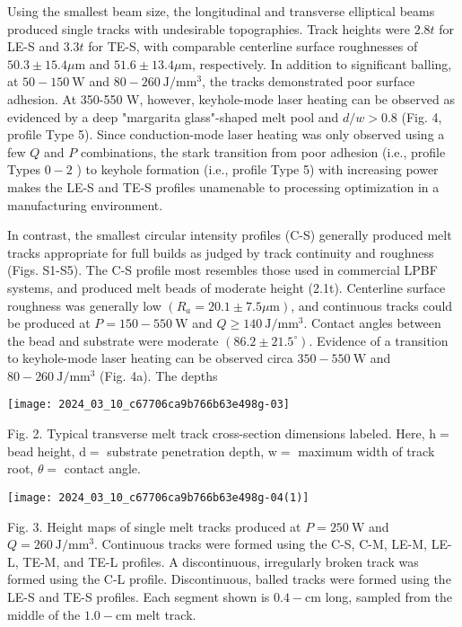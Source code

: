 \documentclass[10pt]{article}
\begin{document}
Using the smallest beam size, the longitudinal and transverse elliptical beams produced single tracks with undesirable topographies. Track heights were $2.8 t$ for LE-S and $3.3 t$ for TE-S, with comparable centerline surface roughnesses of $50.3 \pm 15.4 \mu \mathrm{m}$ and $51.6 \pm 13.4 \mu \mathrm{m}$, respectively. In addition to significant balling, at $50-150 \mathrm{~W}$ and $80-260 \mathrm{~J} / \mathrm{mm}^{3}$, the tracks demonstrated poor surface adhesion. At 350-550 W, however, keyhole-mode laser heating can be observed as evidenced by a deep "margarita glass"-shaped melt pool and $d / w>0.8$ (Fig. 4, profile Type 5). Since conduction-mode laser heating was only observed using a few $Q$ and $P$ combinations, the stark transition from poor adhesion (i.e., profile Types $0-2$ ) to keyhole formation (i.e., profile Type 5) with increasing power makes the LE-S and TE-S profiles unamenable to processing optimization in a manufacturing environment.

In contrast, the smallest circular intensity profiles (C-S) generally produced melt tracks appropriate for full builds as judged by track continuity and roughness (Figs. S1-S5). The C-S profile most resembles those used in commercial LPBF systems, and produced melt beads of moderate height (2.1t). Centerline surface roughness was generally low $\left(R_{a}=20.1 \pm 7.5 \mu \mathrm{m}\right)$, and continuous tracks could be produced at $P=150-550 \mathrm{~W}$ and $Q \geq 140 \mathrm{~J} / \mathrm{mm}^{3}$. Contact angles between the bead and substrate were moderate $\left(86.2 \pm 21.5^{\circ}\right)$. Evidence of a transition to keyhole-mode laser heating can be observed circa $350-550 \mathrm{~W}$ and $80-260 \mathrm{~J} / \mathrm{mm}^{3}$ (Fig. 4a). The depths

\begin{center}
\texttt{[image: 2024\_03\_10\_c67706ca9b766b63e498g-03]}
\end{center}

Fig. 2. Typical transverse melt track cross-section dimensions labeled. Here, $\mathrm{h}=$ bead height, $\mathrm{d}=$ substrate penetration depth, $\mathrm{w}=$ maximum width of track root, $\theta=$ contact angle.

\begin{center}
\texttt{[image: 2024\_03\_10\_c67706ca9b766b63e498g-04(1)]}
\end{center}

Fig. 3. Height maps of single melt tracks produced at $P=250 \mathrm{~W}$ and $Q=260 \mathrm{~J} / \mathrm{mm}^{3}$. Continuous tracks were formed using the C-S, C-M, LE-M, LE-L, TE-M, and TE-L profiles. A discontinuous, irregularly broken track was formed using the C-L profile. Discontinuous, balled tracks were formed using the LE-S and TE-S profiles. Each segment shown is $0.4-\mathrm{cm}$ long, sampled from the middle of the $1.0-\mathrm{cm}$ melt track.
\end{document}
